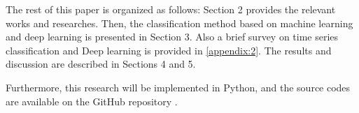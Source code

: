 
The rest of this paper is organized as follows: Section 2 provides the relevant works and researches. Then, the classification method based on machine learning and deep learning is presented in Section 3. Also a brief survey on time series classification and Deep learning is provided in \ref{appendix:2}. The results and discussion are described in Sections 4 and 5.




Furthermore, this research will be implemented in Python, and the source codes are available on the GitHub repository \cite{SKazemii/EE6563}. 









